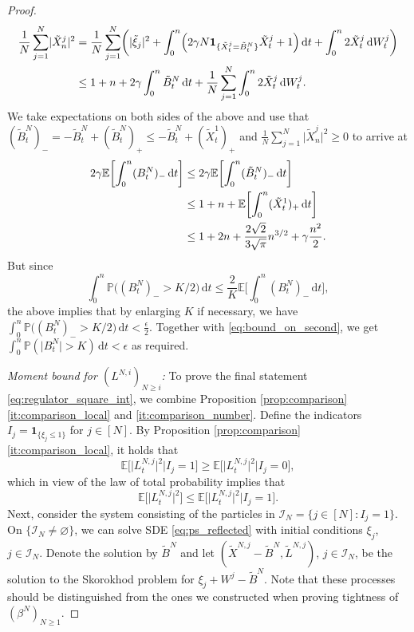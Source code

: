 \documentclass[11pt, a4paper]{article}
\theoremstyle{plain}
\theoremstyle{definition}
\theoremstyle{remark}
\numberwithin{equation}{section}
\newcommand{\ev}{\mathbb{E}}
\newcommand{\pr}{\mathbb{P}}
\renewcommand{\d}{\mathrm{d}}
\newcommand{\define}{\mathpunct{:}}
\renewcommand{\bf}[1]{\mathbf{#1}}
\renewcommand{\cal}[1]{\mathcal{#1}}
\begin{document}
\begin{proof}
\begin{align*}
    \frac{1}{N} \sum_{j = 1}^N \lvert \tilde{X}^j_n\rvert^2 &= \frac{1}{N} \sum_{j = 1}^N \biggl(\lvert \tilde{\xi}_j\rvert^2 + \int_0^n \Bigl(2 \gamma N \bf{1}_{\{\tilde{X}^j_t = \tilde{B}^N_t\}} \tilde{X}^j_t + 1\Bigr) \, \d t + \int_0^n 2\tilde{X}^j_t \, \d W^j_t\biggr) \\
    &\leq 1 + n + 2\gamma \int_0^n \tilde{B}^N_t \, \d t + \frac{1}{N} \sum_{j = 1}^N\int_0^n 2\tilde{X}^j_t \, \d W^j_t.
\end{align*}
We take expectations on both sides of the above and use that $(\tilde{B}^N_t)_- = -\tilde{B}^N_t + (\tilde{B}^N_t)_+ \leq -\tilde{B}^N_t + (\tilde{X}^1_t)_+$ and $\frac{1}{N} \sum_{j = 1}^N \lvert \tilde{X}^j_n\rvert^2 \geq 0$ to arrive at
\begin{align} \label{eq:bound_on_negative}
    2\gamma \ev\biggl[\int_0^n (B^N_t)_- \, \d t\biggr] &\leq 2\gamma \ev\biggl[\int_0^n (\tilde{B}^N_t)_- \, \d t\biggr] \notag \\
    &\leq 1 + n + \ev\biggl[\int_0^n (\tilde{X}^1_t)_+ \, \d t\biggl] \notag \\
    &\leq 1 + 2n + \frac{2\sqrt{2}}{3\sqrt{\pi}} n^{3/2} + \gamma \frac{n^2}{2}.
\end{align}
But since
\begin{equation*}
    \int_0^n \pr\bigl((B^N_t)_- > K/2\bigr) \, \d t \leq \frac{2}{K} \ev\biggl[\int_0^n (B^N_t)_- \, \d t\biggr],
\end{equation*}
the above implies that by enlarging $K$ if necessary, we have $\int_0^n \pr\bigl((B^N_t)_- > K/2\bigr) \, \d t < \frac{\epsilon}{2}$. Together with \eqref{eq:bound_on_second}, we get $\int_0^n \pr(\lvert B^N_t \rvert > K) \, \d t < \epsilon$ as required. 

\textit{Moment bound for $(L^{N, i})_{N \geq i}$:} To prove the final statement \eqref{eq:regulator_square_int}, we combine Proposition \ref{prop:comparison} \ref{it:comparison_local} and \ref{it:comparison_number}. Define the indicators $I_j = \bf{1}_{\{\xi_j \leq 1\}}$ for $j \in [N]$. By Proposition \ref{prop:comparison} \ref{it:comparison_local}, it holds that
\begin{equation*}
    \ev\bigl[\lvert L^{N, j}_t\rvert^2 \big\vert I_j = 1\bigr] \geq \ev\bigl[\lvert L^{N, j}_t\rvert^2 \big\vert I_j = 0\bigr],
\end{equation*}
which in view of the law of total probability implies that
\begin{equation} \label{eq:latp_est}
    \ev\bigl[\lvert L^{N, j}_t\rvert^2\bigr] \leq \ev\bigl[\lvert L^{N, j}_t\rvert^2 \big\vert I_j = 1\bigr].
\end{equation}
Next, consider the system consisting of the particles in $\cal{I}_N = \{j \in [N] \define I_j = 1\}$. On $\{\cal{I}_N \neq \varnothing\}$, we can solve SDE \eqref{eq:ps_reflected} with initial conditions $\xi_j$, $j \in \cal{I}_N$. Denote the solution by $\tilde{B}^N$ and let $(\tilde{X}^{N, j} - \tilde{B}^N, \tilde{L}^{N, j})$, $j \in \cal{I}_N$, be the solution to the Skorokhod problem for $\xi_j + W^j - \tilde{B}^N$. Note that these processes should be distinguished from the ones we constructed when proving tightness of $(\beta^N)_{N \geq 1}$.


\end{proof}
\end{document}
